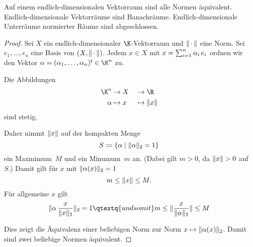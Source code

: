 \begin{thSatz}
    Auf einem endlich-dimensionalen Vektorraum sind alle Normen äquivalent.
    Endlich-dimensionale Vektorräume sind Banachräume. Endlich-dimensionale
    Unterräume normierter Räume sind abgeschlossen.
\end{thSatz}

\begin{proof}
    Sei $X$ ein endlich-dimensionaler $\K$-Vektorraum und $\emptyNorm$ eine Norm.
    Sei $e_1,\dots,e_n$ eine Basis von $(X,\emptyNorm)$. 
    Jedem $x\in X$ mit $x=\isum[1]^n \alpha_i\,e_i$ ordnen wir den Vektor
    $\alpha=(\alpha_1,\dots,\alpha_n)\mt \in\K^n$ zu.
    
    Die Abbildungen
    \begin{alignat*}{2}
        \K^n   &\to X     &&\to\R \\
        \alpha &\mapsto x &&\mapsto\norm{x}
    \end{alignat*}
    sind stetig.
    
    Daher nimmt $\norm{x}$ auf der kompakten Menge
    \[ S \defeq \{ \alpha \Mid \norm{\alpha}_2 = 1 \} \]
    ein Maxmimum~$M$ und ein Minumum~$m$ an. (Dabei gilt $m>0$, da $\norm{x}>0$
    auf~$S$.)
    Damit gilt für $x$ mit $\norm{\alpha(x)}_2 = 1$
    \[ m \leq \norm{x} \leq M . \]
    Für allgemeine $x$ gilt
    \[ \norm{ \alpha\,\frac{x}{\norm{x}_2} }_2 = 1 
        \qtextq{und somit}
        m \leq \norm{\frac{x}{\norm{\alpha}_2}} \leq M
    \]
    
    Dies zeigt die Äquivalenz einer beliebigen Norm zur Norm
    $x\mapsto\norm{\alpha(x)}_2$. Damit sind zwei beliebige Normen äquivalent.
\end{proof}



